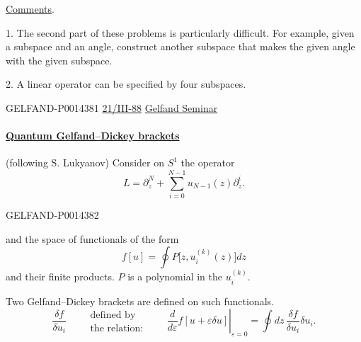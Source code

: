 \uline{Comments}.

1. The second part of these problems is particularly difficult. For example, given a subspace and an angle, construct another subspace that makes the given angle with the given subspace.

2. A linear operator can be specified by four subspaces.


\begin{GelfandAdjacentEvidence}{GELFAND-P001438}{1}
\uline{21/III-88} \qquad \uline{Gelfand Seminar}


\paragraph*{\uline{Quantum Gelfand–Dickey brackets}}
(following S. Lukyanov) \qquad Consider on \(S^1\) the operator
\begin{equation*}
L=\partial_z^N+\sum_{i=0}^{N-1}u_{N-1}(z)\partial_z^i . \tag{1}
\end{equation*}
\end{GelfandAdjacentEvidence}
\begin{GelfandAdjacentEvidence}{GELFAND-P001438}{2}


and the space of functionals of the form
\begin{equation*}
f[u]=\oint P\bigl[z,u_i^{(k)}(z)\bigr]dz \tag{2}
\end{equation*}
and their finite products. \(P\) is a polynomial in the \(u_i^{(k)}\).

Two Gelfand–Dickey brackets are defined on such functionals.
\begin{equation*}
\frac{\delta f}{\delta u_i}\qquad
\begin{gathered}\text{defined by}\\\text{the relation:}\end{gathered}
\qquad\left.\frac{d}{d\varepsilon}f[u+\varepsilon\delta u]\right|_{\varepsilon=0}
=\oint dz\,\frac{\delta f}{\delta u_i}\delta u_i . \tag{3}
\end{equation*}
\end{GelfandAdjacentEvidence}
